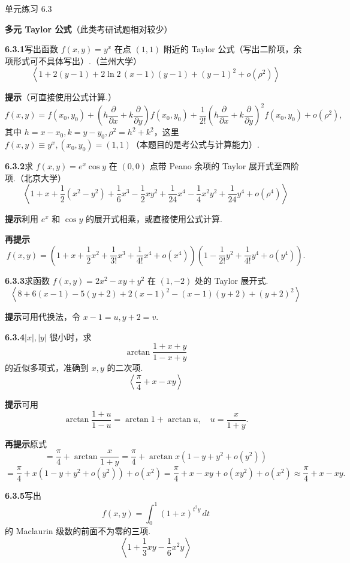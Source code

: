 \documentclass[UTF8, 12pt, fontset=fandol, oneside]{ctexart}
\begin{document}
\begin{center}
  单元练习 6.3
\end{center}

\noindent\textbf{多元 Taylor 公式}\quad （此类考研试题相对较少）

\noindent\textbf{6.3.1}\quad 写出函数 $f(x,y)=y^x$ 在点 $(1,1)$ 附近的 Taylor 公式（写出二阶项，余项形式可不具体写出）.（兰州大学）
\[
  \left\langle
  1+2(y-1)+2\ln2\,(x-1)(y-1)+(y-1)^2+o(\rho^2)
  \right\rangle
\]

\noindent\textbf{提示}\quad （可直接使用公式计算.）
\[
  f(x,y)=f(x_0,y_0)+
  \left(h\frac{\partial}{\partial x}+k\frac{\partial}{\partial y}\right)f(x_0,y_0)
  +\frac1{2!}\left(h\frac{\partial}{\partial x}+k\frac{\partial}{\partial y}\right)^2f(x_0,y_0)
  +o(\rho^2),
\]
其中 $h=x-x_0,k=y-y_0,\rho^2=h^2+k^2$，这里 $f(x,y)\equiv y^x,(x_0,y_0)=(1,1)$（本题目的是考公式与计算能力）.

\noindent\textbf{6.3.2}\quad 求 $f(x,y)=e^x\cos y$ 在 $(0,0)$ 点带 Peano 余项的 Taylor 展开式至四阶项.（北京大学）
\[
  \left\langle
  1+x+\frac12(x^2-y^2)+\frac16x^3-\frac12xy^2
  +\frac1{24}x^4-\frac14x^2y^2+\frac1{24}y^4+o(\rho^4)
  \right\rangle
\]

\noindent\textbf{提示}\quad 利用 $e^x$ 和 $\cos y$ 的展开式相乘，或直接使用公式计算.

\noindent\textbf{再提示}\quad
\[
  f(x,y)=\left(1+x+\frac12x^2+\frac1{3!}x^3+\frac1{4!}x^4+o(x^4)\right)
  \left(1-\frac1{2!}y^2+\frac1{4!}y^4+o(y^4)\right).
\]

\noindent\textbf{6.3.3}\quad 求函数 $f(x,y)=2x^2-xy+y^2$ 在 $(1,-2)$ 处的 Taylor 展开式.
\[
  \left\langle
  8+6(x-1)-5(y+2)+2(x-1)^2-(x-1)(y+2)+(y+2)^2
  \right\rangle
\]

\noindent\textbf{提示}\quad 可用代换法，令 $x-1=u,y+2=v$.

\noindent\textbf{6.3.4}\quad $|x|,|y|$ 很小时，求
\[
  \arctan\frac{1+x+y}{1-x+y}
\]
的近似多项式，准确到 $x,y$ 的二次项.
\[
  \left\langle\frac{\pi}{4}+x-xy\right\rangle
\]

\noindent\textbf{提示}\quad 可用
\[
  \arctan\frac{1+u}{1-u}=\arctan1+\arctan u,\quad
  u=\frac{x}{1+y}.
\]

\noindent\textbf{再提示}\quad 原式
\[
  =\frac{\pi}{4}+\arctan\frac{x}{1+y}
  =\frac{\pi}{4}+\arctan x(1-y+y^2+o(y^2))
\]
\[
  =\frac{\pi}{4}+x(1-y+y^2+o(y^2))+o(x^2)
  =\frac{\pi}{4}+x-xy+o(xy^2)+o(x^2)
  \approx\frac{\pi}{4}+x-xy.
\]

\noindent\textbf{6.3.5}\quad 写出
\[
  f(x,y)=\int_0^1(1+x)^{t^2y}\,dt
\]
的 Maclaurin 级数的前面不为零的三项.
\[
  \left\langle1+\frac13xy-\frac16x^2y\right\rangle
\]
\end{document}
